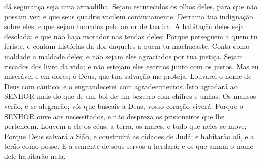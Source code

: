 {{} dá segurança
{} seja uma armadilha.
Sejam escurecidos os olhos deles, para que não possam ver; e que seus quadris vacilem continuamente.
Derrama tua indignação sobre eles; e que sejam tomados pelo ardor de tua ira.
A habitação deles seja desolada; e que não haja morador nas tendas deles;
Porque perseguem
{} a quem tu feriste, e contam histórias da dor daqueles a quem tu machucaste.
Conta como maldade a maldade deles; e não sejam eles agraciados por tua justiça.
Sejam riscados dos livro da vida; e não estejam eles escritos junto com os justos.
Mas eu
{} miserável e em dores; ó Deus, que tua salvação me proteja.
Louvarei o nome de Deus com cântico; e o engrandecerei com agradecimentos.
Isto agradará ao SENHOR mais do que
{} de um boi
{} de um bezerro com chifres e unhas.
Os mansos verão, e se alegrarão; vós que buscais a Deus, vosso coração viverá.
Porque o SENHOR ouve aos necessitados, e não despreza os prisioneiros que lhe pertencem.
Louvem a ele os céus, a terra, os mares, e tudo que neles se move;
Porque Deus salvará a Sião, e construirá as cidades de Judá; e habitarão ali, e a terão como posse.
E a semente de seus servos a herdará; e os que amam o nome dele habitarão nela.

\par }
